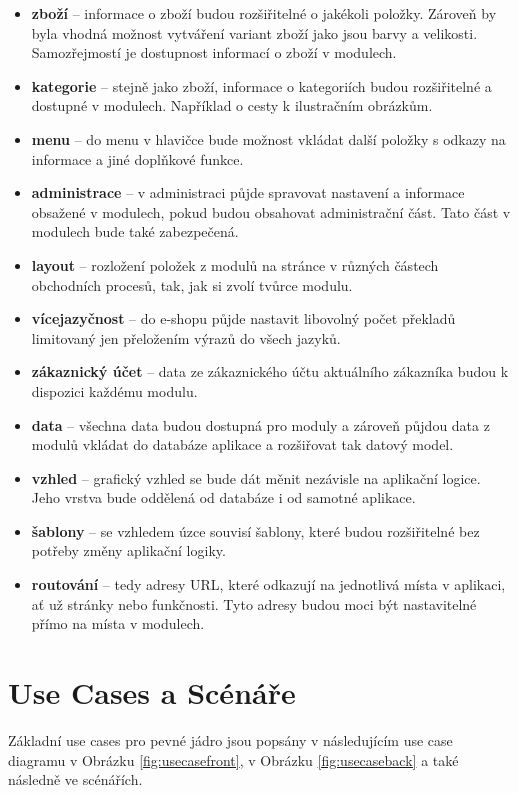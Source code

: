 \documentclass[11pt,twoside,a4paper]{book}
\begin{document}
\begin{itemize}
\item \textbf{zboží} -- informace o zboží budou rozšiřitelné o jakékoli položky. Zároveň by byla vhodná možnost vytváření variant zboží jako jsou barvy a velikosti. Samozřejmostí je dostupnost informací o zboží v modulech.
\item \textbf{kategorie} -- stejně jako zboží, informace o kategoriích budou rozšiřitelné a dostupné v modulech. Například o cesty k ilustračním obrázkům.
\item \textbf{menu} -- do menu v hlavičce bude možnost vkládat další položky s odkazy na informace a jiné doplňkové funkce.
\item \textbf{administrace} -- v administraci půjde spravovat nastavení a informace obsažené v modulech, pokud budou obsahovat administrační část. Tato část v modulech bude také zabezpečená.
\item \textbf{layout} -- rozložení položek z modulů na stránce v různých částech obchodních procesů, tak, jak si zvolí tvůrce modulu.
\item \textbf{vícejazyčnost} -- do e-shopu půjde nastavit libovolný počet překladů limitovaný jen přeložením výrazů do všech jazyků.
\item \textbf{zákaznický účet} -- data ze zákaznického účtu aktuálního zákazníka budou k dispozici každému modulu.
\item \textbf{data} -- všechna data budou dostupná pro moduly a zároveň půjdou data z modulů vkládat do databáze aplikace a rozšiřovat tak datový model.
\item \textbf{vzhled} -- grafický vzhled se bude dát měnit nezávisle na aplikační logice. Jeho vrstva bude oddělená od databáze i od samotné aplikace.
\item \textbf{šablony} -- se vzhledem úzce souvisí šablony, které budou rozšiřitelné bez potřeby změny aplikační logiky.
\item \textbf{routování} -- tedy adresy URL, které odkazují na jednotlivá místa v aplikaci, ať už stránky nebo funkčnosti. Tyto adresy budou moci být nastavitelné přímo na místa v modulech. 
\end{itemize}


\section{Use Cases a Scénáře}
\label{sec:usecase}
Základní use cases pro pevné jádro jsou popsány v následujícím use case diagramu v Obrázku \ref{fig:usecasefront}, v Obrázku \ref{fig:usecaseback} a také následně ve scénářích.
\end{document}
